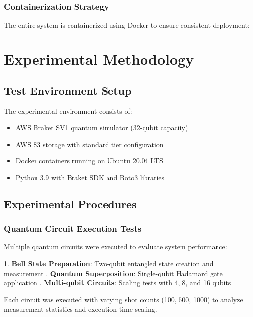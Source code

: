 \documentclass[onecolumn]{IEEEtran}
\begin{document}
\subsubsection{Containerization Strategy}

The entire system is containerized using Docker to ensure consistent deployment:



\section{Experimental Methodology}

\subsection{Test Environment Setup}

The experimental environment consists of:
\begin{itemize}
    \item AWS Braket SV1 quantum simulator (32-qubit capacity)
    \item AWS S3 storage with standard tier configuration
    \item Docker containers running on Ubuntu 20.04 LTS
    \item Python 3.9 with Braket SDK and Boto3 libraries
\end{itemize}

\subsection{Experimental Procedures}

\subsubsection{Quantum Circuit Execution Tests}

Multiple quantum circuits were executed to evaluate system performance:

\begin{center}
    1. \textbf{Bell State Preparation}: Two-qubit entangled state creation and measurement 
    . \textbf{Quantum Superposition}: Single-qubit Hadamard gate application . \textbf{Multi-qubit Circuits}: Scaling tests with 4, 8, and 16 qubits
\end{center}
    
    
Each circuit was executed with varying shot counts (100, 500, 1000) to analyze measurement statistics and execution time scaling.
\end{document}

